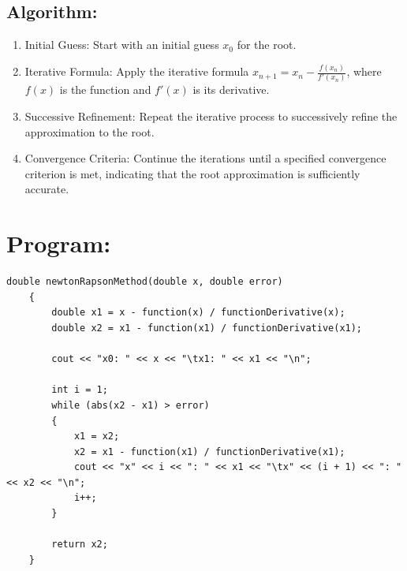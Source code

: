 \documentclass[a4paper,12pt]{report}
\begin{document}
\subsection*{Algorithm:}
\begin{enumerate}
    \item Initial Guess: Start with an initial guess \(x_0\) for the root.
    \item Iterative Formula: Apply the iterative formula \(x_{n+1} = x_n - \frac{f(x_n)}{f'(x_n)}\), where \(f(x)\) is the function and \(f'(x)\) is its derivative.
    \item Successive Refinement: Repeat the iterative process to successively refine the approximation to the root.
    \item Convergence Criteria: Continue the iterations until a specified convergence criterion is met, indicating that the root approximation is sufficiently accurate.
\end{enumerate}

\section*{Program:}

\begin{lstlisting}[style=cppstyle, caption={Newton-Rapson Method}, label={lst:cppcode}, basicstyle=\fontsize{10}{11}\selectfont\ttfamily]
    double newtonRapsonMethod(double x, double error)
    {
        double x1 = x - function(x) / functionDerivative(x);
        double x2 = x1 - function(x1) / functionDerivative(x1);
    
        cout << "x0: " << x << "\tx1: " << x1 << "\n";
    
        int i = 1;
        while (abs(x2 - x1) > error)
        {
            x1 = x2;
            x2 = x1 - function(x1) / functionDerivative(x1);
            cout << "x" << i << ": " << x1 << "\tx" << (i + 1) << ": " << x2 << "\n";
            i++;
        }
    
        return x2;
    }
\end{lstlisting}
\end{document}

